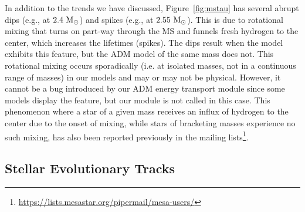 \documentclass[useAMS,usenatbib]{mnras}
\begin{document}
In addition to the trends we have discussed, Figure~\ref{fig:mstau} has several abrupt dips (e.g., at $2.4 \ \mathrm{M}_{\odot}$) and spikes (e.g., at $2.55 \ \mathrm{M}_{\odot}$). This is due to rotational mixing that turns on part-way through the MS and funnels fresh hydrogen to the center, which increases the lifetimes (spikes). The dips result when the \nodm model exhibits this feature, but the ADM model of the same mass does not. This rotational mixing occurs sporadically (i.e. at isolated masses, not in a continuous range of masses) in our models and may or may not be physical. However, it cannot be a bug introduced by our ADM energy transport module since some \nodm models display the feature, but our module is not called in this case. This phenomenon where a star of a given mass receives an influx of hydrogen to the center due to the onset of mixing, while stars of bracketing masses experience no such mixing, has also been reported previously in the \mesa mailing lists\footnote{\url{https://lists.mesastar.org/pipermail/mesa-users/}}.


\subsection{Stellar Evolutionary Tracks}
\label{sub:tracks}
\end{document}
